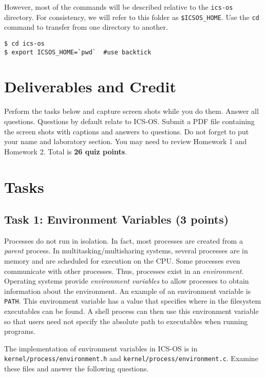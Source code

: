 \documentclass[a4paper, 11pt,oneside]{article}
\begin{document}
However, most of the commands will be described relative to the \texttt{ics-os} directory.
For consistency, we will refer to this folder as \texttt{\$ICSOS\_HOME}. Use the \texttt{cd} 
command to transfer from one directory to another.
\begin{Verbatim}[frame=single]
$ cd ics-os
$ export ICSOS_HOME=`pwd`  #use backtick
\end{Verbatim}

\section{Deliverables and Credit}
Perform the tasks below and capture screen shots while you do them. Answer
all questions. Questions by default relate to ICS-OS. Submit a PDF file containing the screen shots with captions 
and answers to questions. Do not forget to put your name and laboratory
section. You may need to review Homework 1 and Homework 2. Total is \textbf{26 quiz points}.

\section{Tasks}

\subsection*{Task 1: Environment Variables (3 points)} 
Processes do not run in isolation. In fact, most processes are created from a \textit{parent} process. 
In multitasking/multisharing systems, several processes are in memory and are scheduled for execution 
on the CPU. Some processes even communicate with other processes. Thus, processes exist in an \textit{environment}. Operating systems provide \textit{environment variables} to allow processes to obtain information about the environment. An example of an environment variable is \texttt{PATH}. This 
environment variable has a value that specifies where in the filesystem executables 
can be found. A shell process can then use this environment variable so that users need not specify the absolute path to executables when running programs.

The implementation of environment variables in ICS-OS is in \texttt{kernel/process/environment.h} and 
\texttt{kernel/process/environment.c}. Examine these files and answer the following questions.



\noindent{}
\end{document}
